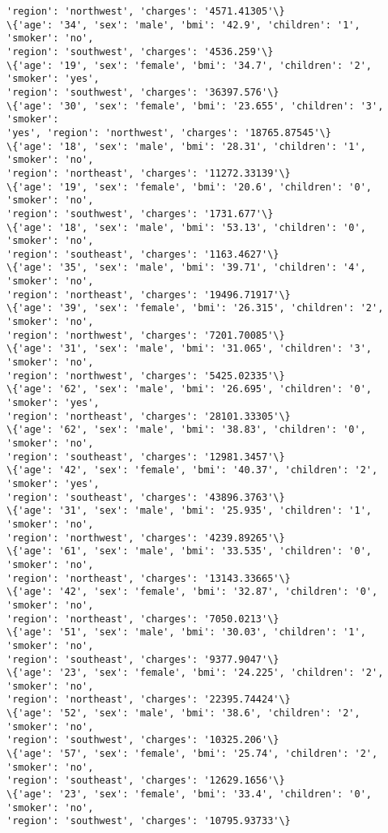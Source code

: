 \documentclass[11pt]{article}
\begin{document}
\begin{Verbatim}[commandchars=\\\{\}]
'region': 'northwest', 'charges': '4571.41305'\}
\{'age': '34', 'sex': 'male', 'bmi': '42.9', 'children': '1', 'smoker': 'no',
'region': 'southwest', 'charges': '4536.259'\}
\{'age': '19', 'sex': 'female', 'bmi': '34.7', 'children': '2', 'smoker': 'yes',
'region': 'southwest', 'charges': '36397.576'\}
\{'age': '30', 'sex': 'female', 'bmi': '23.655', 'children': '3', 'smoker':
'yes', 'region': 'northwest', 'charges': '18765.87545'\}
\{'age': '18', 'sex': 'male', 'bmi': '28.31', 'children': '1', 'smoker': 'no',
'region': 'northeast', 'charges': '11272.33139'\}
\{'age': '19', 'sex': 'female', 'bmi': '20.6', 'children': '0', 'smoker': 'no',
'region': 'southwest', 'charges': '1731.677'\}
\{'age': '18', 'sex': 'male', 'bmi': '53.13', 'children': '0', 'smoker': 'no',
'region': 'southeast', 'charges': '1163.4627'\}
\{'age': '35', 'sex': 'male', 'bmi': '39.71', 'children': '4', 'smoker': 'no',
'region': 'northeast', 'charges': '19496.71917'\}
\{'age': '39', 'sex': 'female', 'bmi': '26.315', 'children': '2', 'smoker': 'no',
'region': 'northwest', 'charges': '7201.70085'\}
\{'age': '31', 'sex': 'male', 'bmi': '31.065', 'children': '3', 'smoker': 'no',
'region': 'northwest', 'charges': '5425.02335'\}
\{'age': '62', 'sex': 'male', 'bmi': '26.695', 'children': '0', 'smoker': 'yes',
'region': 'northeast', 'charges': '28101.33305'\}
\{'age': '62', 'sex': 'male', 'bmi': '38.83', 'children': '0', 'smoker': 'no',
'region': 'southeast', 'charges': '12981.3457'\}
\{'age': '42', 'sex': 'female', 'bmi': '40.37', 'children': '2', 'smoker': 'yes',
'region': 'southeast', 'charges': '43896.3763'\}
\{'age': '31', 'sex': 'male', 'bmi': '25.935', 'children': '1', 'smoker': 'no',
'region': 'northwest', 'charges': '4239.89265'\}
\{'age': '61', 'sex': 'male', 'bmi': '33.535', 'children': '0', 'smoker': 'no',
'region': 'northeast', 'charges': '13143.33665'\}
\{'age': '42', 'sex': 'female', 'bmi': '32.87', 'children': '0', 'smoker': 'no',
'region': 'northeast', 'charges': '7050.0213'\}
\{'age': '51', 'sex': 'male', 'bmi': '30.03', 'children': '1', 'smoker': 'no',
'region': 'southeast', 'charges': '9377.9047'\}
\{'age': '23', 'sex': 'female', 'bmi': '24.225', 'children': '2', 'smoker': 'no',
'region': 'northeast', 'charges': '22395.74424'\}
\{'age': '52', 'sex': 'male', 'bmi': '38.6', 'children': '2', 'smoker': 'no',
'region': 'southwest', 'charges': '10325.206'\}
\{'age': '57', 'sex': 'female', 'bmi': '25.74', 'children': '2', 'smoker': 'no',
'region': 'southeast', 'charges': '12629.1656'\}
\{'age': '23', 'sex': 'female', 'bmi': '33.4', 'children': '0', 'smoker': 'no',
'region': 'southwest', 'charges': '10795.93733'\}

\end{Verbatim}
\end{document}
